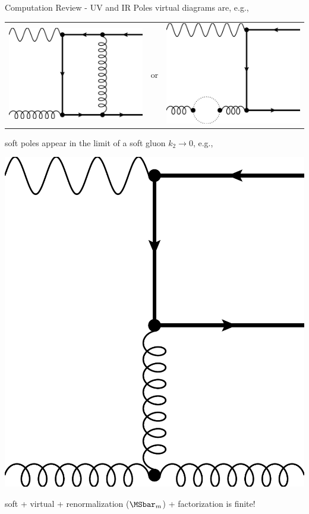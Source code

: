 \begin{frame}{Computation Review - UV and IR Poles}
virtual diagrams are, e.g.,
\begin{center}
\begin{tabular}{wnw}
\includegraphics[width=.25\textwidth]{img/nlo-v-1}
&or
&\includegraphics[width=.25\textwidth]{img/nlo-v-5}
\end{tabular}
\end{center}

soft poles appear in the limit of a soft gluon $k_2\rightarrow 0$, e.g.,
\begin{center}
\includegraphics[width=.2\textwidth]{img/nlo-g-4}
\end{center}

soft + virtual + renormalization ($\MSbar_m$) + factorization is finite! 
\end{frame}

